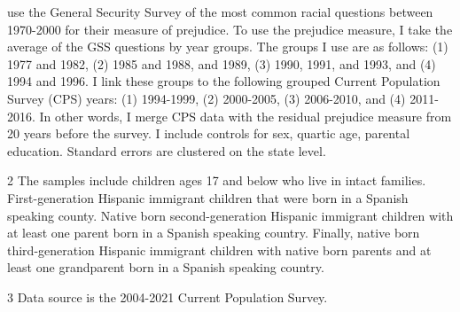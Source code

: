 \begin{table}[!h]
{\begin{threeparttable}
\begin{tablenotes}
{                      \citet{charlesPrejudiceWagesEmpirical2008} use the General Security Survey of the most common racial questions between 1970-2000 for their measure of prejudice.
                      To use the prejudice   measure, I take the average of the GSS questions by year groups. The groups I use are as follows:
                      (1) 1977 and 1982, (2) 1985 and 1988, and 1989, (3) 1990, 1991, and 1993, and (4) 1994 and 1996. I link these groups to the following
                      grouped Current Population Survey (CPS) years: (1) 1994-1999, (2) 2000-2005, (3) 2006-2010, and (4) 2011-2016. 
                      In other words, I merge CPS data with the residual prejudice  measure from 20 years before the survey.
                      I include controls for sex, quartic age, parental education.
                      Standard errors are clustered on the state level.}
\item[2] \footnotesize{The samples include children ages 17 and below who live in intact families. 
                      First-generation Hispanic immigrant children that were born in a 
                      Spanish speaking county. Native born second-generation Hispanic 
                      immigrant children with at least one parent born in a Spanish speaking 
                      country. Finally, native born third-generation Hispanic immigrant children 
                      with native born parents and at least one grandparent born in a Spanish 
                      speaking country.}
\item[3] \footnotesize{Data source is the 2004-2021 Current Population Survey.}
\end{tablenotes}
\end{threeparttable}}
\end{table}
